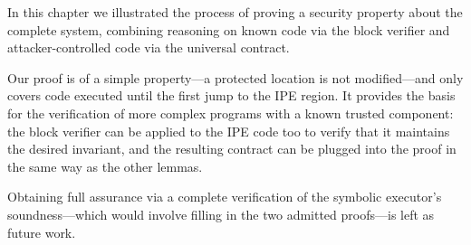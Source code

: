 In this chapter we illustrated the process of proving a security property about the complete system, combining reasoning on known code via the block verifier and attacker-controlled code via the universal contract.

Our proof is of a simple property---a protected location is not modified---and only covers code executed until the first jump to the IPE region. It provides the basis for the verification of more complex programs with a known trusted component: the block verifier can be applied to the IPE code too to verify that it maintains the desired invariant, and the resulting contract can be plugged into the proof in the same way as the other  lemmas.

Obtaining full assurance via a complete verification of the symbolic executor's soundness---which would involve filling in the two admitted proofs---is left as future work.
